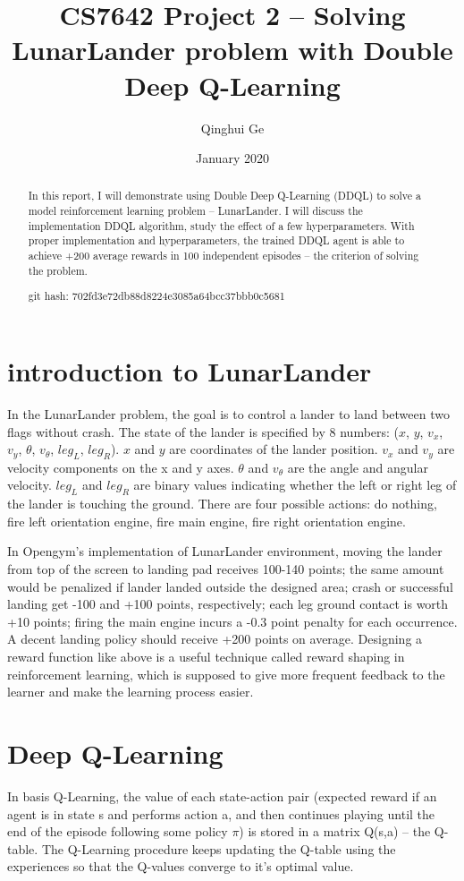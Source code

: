 \documentclass[conference]{IEEEtran}
\title{CS7642 Project 2 -- Solving LunarLander problem with Double Deep Q-Learning}
\author{Qinghui Ge}
\date{January 2020}
\begin{document}
	
	\maketitle
	
\begin{abstract}
	In this report, I will demonstrate using Double Deep Q-Learning (DDQL) to solve a model reinforcement learning problem -- LunarLander\cite{LunarLander}. I will discuss the implementation DDQL algorithm, study the effect of a few hyperparameters. With proper implementation and hyperparameters, the trained DDQL agent is able to achieve +200 average rewards in 100 independent episodes -- the criterion of solving the problem.
	
	git hash: 702fd3e72db88d8224e3085a64bcc37bbb0c5681
\end{abstract}
	
\section{introduction to LunarLander}
In the LunarLander problem, the goal is to control a lander to land between two flags without crash. The state of the lander is specified by 8 numbers: ($x$, $y$, $v_x$, $v_y$, $\theta$, $v_\theta$, $leg_L$, $leg_R$).
$x$ and $y$ are coordinates of the lander position. $v_x$ and $v_y$ are velocity components on the x and y axes. $\theta$ and $v_\theta$ are the angle and angular velocity. $leg_L$ and $leg_R$ are binary values indicating whether the left or right leg of the lander is touching the ground. There are four possible actions: do nothing, fire left orientation engine, fire main engine, fire right orientation engine.

In Opengym's\cite{opengym} implementation of LunarLander environment, moving the lander from top of the screen to landing pad receives 100-140 points; the same amount would be penalized if lander landed outside the designed area; crash or successful landing get -100 and +100 points, respectively; each leg ground contact is worth +10 points; firing the main engine incurs a -0.3 point penalty for each occurrence. A decent landing policy should receive +200 points on average. Designing a reward function like above is a useful technique called reward shaping\cite{mataric1994reward,ng1999policy} in reinforcement learning, which is supposed to give more frequent feedback to the learner and make the learning process easier. 

\section{Deep Q-Learning}
In basis Q-Learning, the value of each state-action pair (expected reward if an agent is in state s and performs action a, and then continues playing until the end of the episode following some policy $\pi$) is stored in a matrix Q(s,a) -- the Q-table. The Q-Learning procedure keeps updating the Q-table using the experiences so that the Q-values converge to it's optimal value. 
\end{document}
